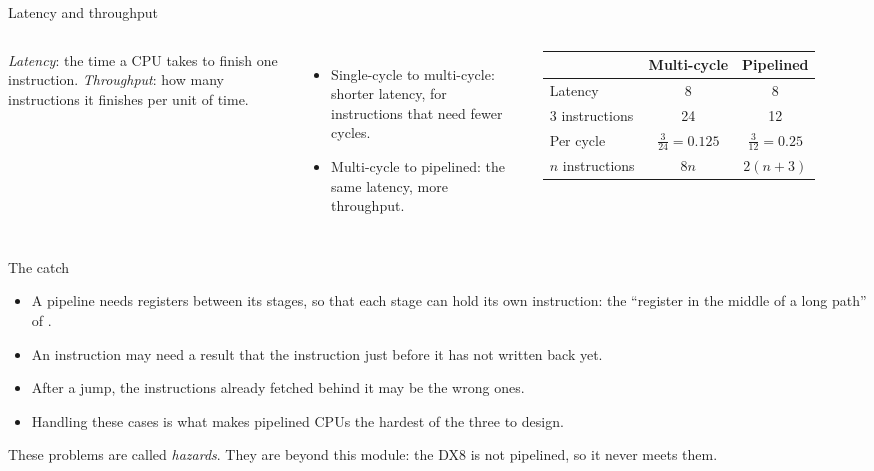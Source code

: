 \documentclass[10pt]{wosm-slides}
\begin{document}
\begin{frame}{Latency and throughput}
  \begin{columns}[T, totalwidth=\textwidth]
      \begin{definition}
        \emph{Latency}: the time a CPU takes to finish one instruction.
        \emph{Throughput}: how many instructions it finishes per unit of time.
      \end{definition}
      \begin{itemize}
        \item Single-cycle to multi-cycle: shorter latency, for instructions that
          need fewer cycles.
        \item Multi-cycle to pipelined: the same latency, more throughput.
      \end{itemize}
      \centering
      \small
      \begin{tabular}{@{}lcc@{}}
        \toprule
        & Multi-cycle & Pipelined \\
        \midrule
        Latency & 8 & 8 \\
        3 instructions & 24 & 12 \\
        Per cycle & $\frac{3}{24} = 0.125$ & $\frac{3}{12} = 0.25$ \\
        $n$ instructions & $8n$ & $2(n + 3)$ \\
        \bottomrule
      \end{tabular}\par\medskip
  \end{columns}
\end{frame}

\begin{frame}{The catch}
  \begin{itemize}
    \item A pipeline needs registers between its stages, so that each stage can hold
      its own instruction: the ``register in the middle of a long path'' of
      .
    \item An instruction may need a result that the instruction just before it has
      not written back yet.
    \item After a jump, the instructions already fetched behind it may be the wrong
      ones.
    \item Handling these cases is what makes pipelined CPUs the hardest of the three
      to design.
  \end{itemize}

  \begin{remark}
    These problems are called \emph{hazards}. They are beyond this module: the DX8 is
    not pipelined, so it never meets them.
  \end{remark}
\end{frame}
\end{document}
